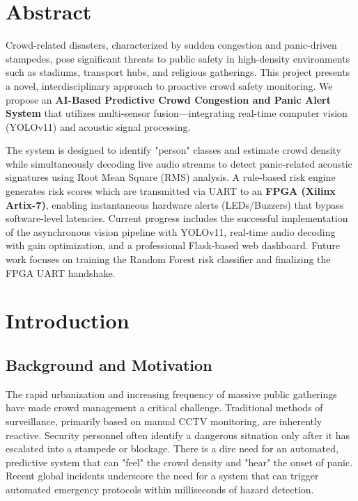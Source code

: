 \documentclass[12pt,oneside,a4paper]{book}
\begin{document}
\chapter*{Abstract}
Crowd-related disasters, characterized by sudden congestion and panic-driven stampedes, pose significant threats to public safety in high-density environments such as stadiums, transport hubs, and religious gatherings. This project presents a novel, interdisciplinary approach to proactive crowd safety monitoring. We propose an \textbf{AI-Based Predictive Crowd Congestion and Panic Alert System} that utilizes multi-sensor fusion—integrating real-time computer vision (YOLOv11) and acoustic signal processing.

The system is designed to identify "person" classes and estimate crowd density while simultaneously decoding live audio streams to detect panic-related acoustic signatures using Root Mean Square (RMS) analysis. A rule-based risk engine generates risk scores which are transmitted via UART to an \textbf{FPGA (Xilinx Artix-7)}, enabling instantaneous hardware alerts (LEDs/Buzzers) that bypass software-level latencies. Current progress includes the successful implementation of the asynchronous vision pipeline with YOLOv11, real-time audio decoding with gain optimization, and a professional Flask-based web dashboard. Future work focuses on training the Random Forest risk classifier and finalizing the FPGA UART handshake.

\tableofcontents
\listoffigures
\listoftables
\newpage

\chapter{Introduction}

\section{Background and Motivation}
The rapid urbanization and increasing frequency of massive public gatherings have made crowd management a critical challenge. Traditional methods of surveillance, primarily based on manual CCTV monitoring, are inherently reactive. Security personnel often identify a dangerous situation only after it has escalated into a stampede or blockage. There is a dire need for an automated, predictive system that can "feel" the crowd density and "hear" the onset of panic. Recent global incidents underscore the need for a system that can trigger automated emergency protocols within milliseconds of hazard detection.
\end{document}
